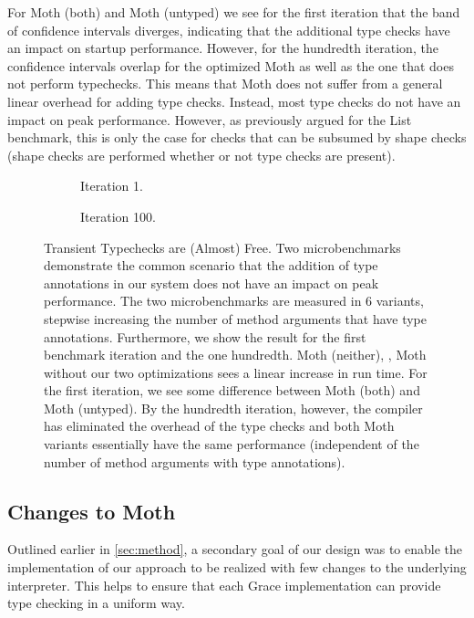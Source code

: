 For Moth (both) and Moth (untyped) we see for the first iteration that
the band of confidence intervals diverges, indicating that the additional type
checks have an impact on startup performance.
However, for the hundredth iteration, the confidence intervals overlap
for the optimized Moth as well as the one that does not perform typechecks.
This means that Moth does not suffer from
a general linear overhead for adding type checks.
Instead, most type checks do not have an impact on peak performance.
However, as previously argued for the List benchmark,
this is only the case for checks that can be subsumed by shape checks
(shape checks are performed whether or not type checks are present).

\begin{figure}
  \begin{subfigure}[t]{0.5\textwidth}
    \centering
    \TypeCostFirstIt{}
    \caption{Iteration 1.}
  \end{subfigure}\hfill
  \begin{subfigure}[t]{0.5\textwidth}
    \centering
    \TypeCostLastIt{}
    \caption{Iteration 100.}
  \end{subfigure}

  \caption{Transient Typechecks are (Almost) Free.
    Two microbenchmarks demonstrate the common scenario that the addition
    of type annotations in our system does not have an impact on peak performance.
    The two microbenchmarks are measured in 6 variants, stepwise increasing the number
    of method arguments that have type annotations.
    Furthermore, we show the result for the first benchmark iteration and the
    one hundredth.
    Moth (neither), \ie, Moth without our two optimizations sees a linear increase in run time.
    For the first iteration, we see some difference between Moth (both) and Moth (untyped).
    By the hundredth iteration, however, the compiler has eliminated
    the overhead of the type checks
    and both Moth variants essentially have the same performance
    (independent of the number of method arguments with type annotations).}
	\label{fig:type-cost-micro}
\end{figure}

\subsection{Changes to Moth}

Outlined earlier in \cref{sec:method}, a secondary
goal of our design was to enable the implementation of our approach to be
realized with few changes to the underlying interpreter.
This helps to ensure that each Grace implementation
can provide type checking in a uniform way.

